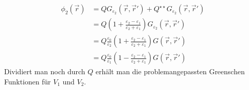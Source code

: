 		  		\begin{equation}\label{spiegdielekt2}\begin{split}
		  				\phi_2(\vec{r} ) & = Q G_{\varepsilon_2}(\vec{r} , \vec{r}' ) +  Q^{\star\star} G_{\varepsilon_2}(\vec{r} , \vec{r}' )\\
		  				& = Q \left( 1 +  \frac{\varepsilon_2-\varepsilon_1}{\varepsilon_2+\varepsilon_1}\right) G_{\varepsilon_2}(\vec{r} , \vec{r}' ) \\
		  				& = Q\frac{\varepsilon_0}{\varepsilon_2} \left( 1 +  \frac{\varepsilon_2-\varepsilon_1}{\varepsilon_2+\varepsilon_1}\right) G(\vec{r} , \vec{r}' ) \\
		  				& = Q\frac{\varepsilon_0}{\varepsilon_1} \left( 1 -  \frac{\varepsilon_2-\varepsilon_1}{\varepsilon_2+\varepsilon_1}\right) G(\vec{r} , \vec{r}' )
		  		\end{split}\end{equation}
	  	Dividiert man noch durch $Q$ erhält man die problemangepassten Greenschen Funktionen für $V_1$ und $V_2$.
